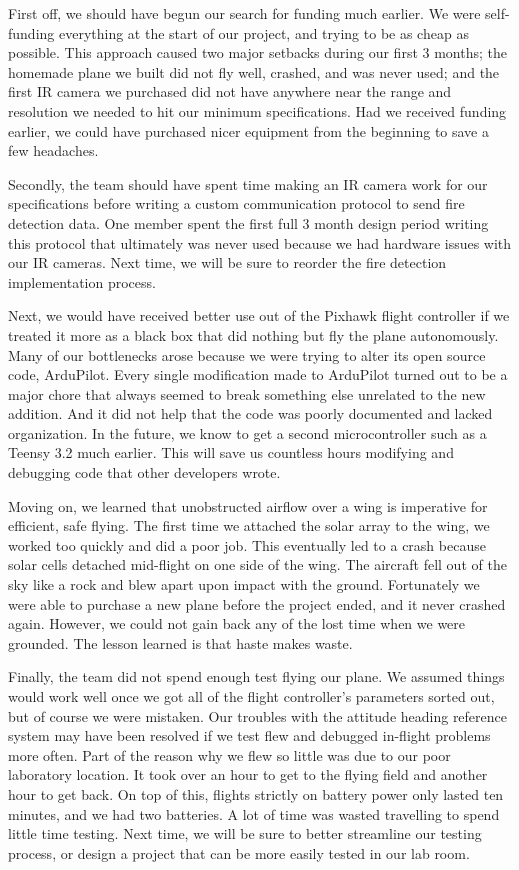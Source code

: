 \documentclass[12pt,journal,compsoc]{IEEEtran}
\begin{document}
First off, we should have begun our search for funding much earlier. We were self-funding everything at the start of our project, and trying to be as cheap as possible. This approach caused two major setbacks during our first 3 months; the homemade plane we built did not fly well, crashed, and was never used; and the first IR camera we purchased did not have anywhere near the range and resolution we needed to hit our minimum specifications. Had we received funding earlier, we could have purchased nicer equipment from the beginning to save a few headaches.

Secondly, the team should have spent time making an IR camera work for our specifications before writing a custom communication protocol to send fire detection data. One member spent the first full 3 month design period writing this protocol that ultimately was never used because we had hardware issues with our IR cameras. Next time, we will be sure to reorder the fire detection implementation process.

Next, we would have received better use out of the Pixhawk flight controller if we treated it more as a black box that did nothing but fly the plane autonomously. Many of our bottlenecks arose because we were trying to alter its open source code, ArduPilot. Every single modification made to ArduPilot turned out to be a major chore that always seemed to break something else unrelated to the new addition. And it did not help that the code was poorly documented and lacked organization. In the future, we know to get a second microcontroller such as a Teensy 3.2 much earlier. This will save us countless hours modifying and debugging code that other developers wrote.

Moving on, we learned that unobstructed airflow over a wing is imperative for efficient, safe flying. The first time we attached the solar array to the wing, we worked too quickly and did a poor job. This eventually led to a crash because solar cells detached mid-flight on one side of the wing. The aircraft fell out of the sky like a rock and blew apart upon impact with the ground. Fortunately we were able to purchase a new plane before the project ended, and it never crashed again. However, we could not gain back any of the lost time when we were grounded. The lesson learned is that haste makes waste.

Finally, the team did not spend enough test flying our plane. We assumed things would work well once we got all of the flight controller's parameters sorted out, but of course we were mistaken. Our troubles with the attitude heading reference system may have been resolved if we test flew and debugged in-flight problems more often. Part of the reason why we flew so little was due to our poor laboratory location. It took over an hour to get to the flying field and another hour to get back. On top of this, flights strictly on battery power only lasted ten minutes, and we had two batteries. A lot of time was wasted travelling to spend little time testing. Next time, we will be sure to better streamline our testing process, or design a project that can be more easily tested in our lab room.
\end{document}
